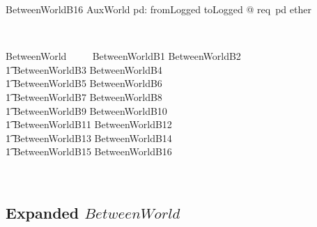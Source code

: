 \begin{LNewSDef}
\begin{schema}{BetweenWorldB16}
   AuxWorld
\where
\forall pd: fromLogged \cup toLogged @ req~pd \in ether
\end{schema}~\end{LNewSDef}

\begin{LSDef}
\begin{zed}
   BetweenWorld ~~~~     BetweenWorldB1 \land BetweenWorldB2 \land \\
                          \t1 BetweenWorldB3 \land BetweenWorldB4 \land \\
                          \t1 BetweenWorldB5 \land BetweenWorldB6 \land \\
                          \t1 BetweenWorldB7  \land BetweenWorldB8 \land \\
                          \t1 BetweenWorldB9 \land BetweenWorldB10 \land \\
                          \t1 BetweenWorldB11 \land BetweenWorldB12 \land \\
                          \t1 BetweenWorldB13 \land BetweenWorldB14 \land \\
                          \t1 BetweenWorldB15 \land BetweenWorldB16
\end{zed}~\end{LSDef}

\subsection*{Expanded $BetweenWorld$}


